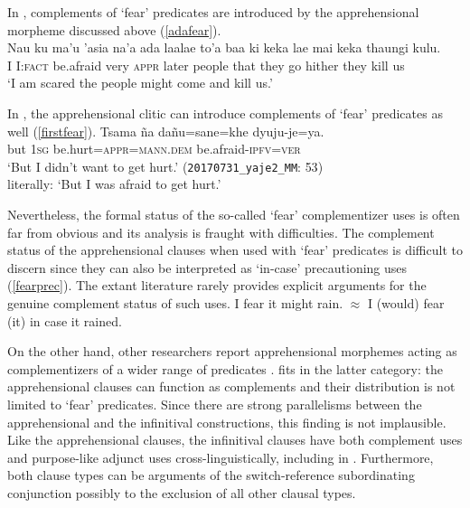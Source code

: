 \documentclass[output=paper,colorlinks,citecolor=brown]{langscibook}
\begin{document}
In , complements of `fear' predicates are introduced by the apprehensional morpheme  discussed above (\ref{adafear}).
    \ea \label{adafear}
     \\
    \gll Nau ku ma'u {'asia na'a} {\ob}ada laalae to'a baa {ki keka} lae mai keka thaungi kulu.{\cb} \\
    I I:\textsc{fact} {be.afraid} very \textsc{appr} later people that they go hither they kill us\\
    \glt `I am scared the people might come and kill us.'
    \z
    
In , the apprehensional clitic  can introduce complements of `fear' predicates as well (\ref{firstfear}).
    \ea \label{firstfear} %
    \gll Tsama ña   {{\ob}dañu=sane=khe{\cb}}         dyuju-je=ya. \\
         but \textsc{1sg} {be.hurt=\textsc{appr=mann.dem}} {be.afraid-\textsc{ipfv=ver}} \\
    \glt `But I didn't want to get hurt.' \hfill (\texttt{20170731\_yaje2\_MM}: {\textsc{53})} \nopagebreak\\\nopagebreak
    literally: `But I was afraid to get hurt.'
    \z 
    
Nevertheless, the formal status of the so-called `fear' complementizer uses is often far from obvious and its analysis is fraught with difficulties.
The complement status of the apprehensional clauses when used with `fear' predicates is difficult to discern since they can also be interpreted as `in-case' precautioning uses (\ref{fearprec}). The extant literature rarely provides explicit arguments for the genuine complement status of such uses.
    \ea \label{fearprec}
    \glt I fear it might rain. $\approx$ I (would) fear (it) in case it rained.
    \z 

On the other hand, other researchers report apprehensional morphemes acting as complementizers of a wider range of predicates \citep{yallop1997alyawarra, francois2003semantique}.  fits in the latter category: the apprehensional  clauses can function as complements and their distribution is not limited to `fear' predicates. Since there are strong parallelisms between the apprehensional and the infinitival constructions, this finding is not implausible. Like the apprehensional  clauses, the infinitival  clauses have both complement uses and purpose-like adjunct uses cross-linguistically, including in . Furthermore, both clause types can be {arguments} of the switch-reference subordinating conjunction \srcn[,] possibly to the exclusion of all other clausal types.
\end{document}
